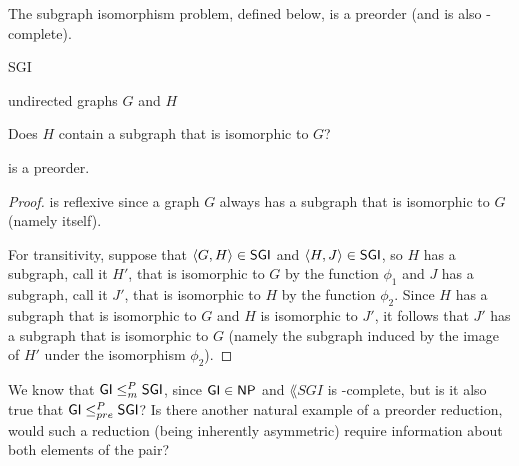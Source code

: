 The subgraph isomorphism problem, defined below, is a preorder (and is also \NP-complete\cite{gj79}).
\begin{langdef}{SGI}
\begin{instance}
  undirected graphs $G$ and $H$
\end{instance}
\begin{question}
  Does $H$ contain a subgraph that is isomorphic to $G$?
\end{question}
\end{langdef}

\begin{proposition}
   is a preorder.
\end{proposition}
\begin{proof}
   is reflexive since a graph $G$ always has a subgraph that is isomorphic to $G$ (namely itself).

  For transitivity, suppose that $\langle G,H\rangle\in{\ensuremath{\mathsf{SGI}}}$ and $\langle H,J\rangle\in{\ensuremath{\mathsf{SGI}}}$, so $H$ has a subgraph, call it $H'$, that is isomorphic to $G$ by the function $\phi_1$ and $J$ has a subgraph, call it $J'$, that is isomorphic to $H$ by the function $\phi_2$.
  Since $H$ has a subgraph that is isomorphic to $G$ and $H$ is isomorphic to $J'$, it follows that $J'$ has a subgraph that is isomorphic to $G$ (namely the subgraph induced by the image of $H'$ under the isomorphism $\phi_2$).
\end{proof}

We know that ${\mathsf{GI}}\leq^{P}_{m}{\mathsf{SGI}}$, since ${\mathsf{GI}}\in{\ensuremath{\mathsf{NP}}}$ and $\lang{SGI}$ is \NP-complete, but is it also true that ${\mathsf{GI}}\leq^{P}_{pre}{\mathsf{SGI}}$?
Is there another natural example of a preorder reduction, would such a reduction (being inherently asymmetric) require information about both elements of the pair?
